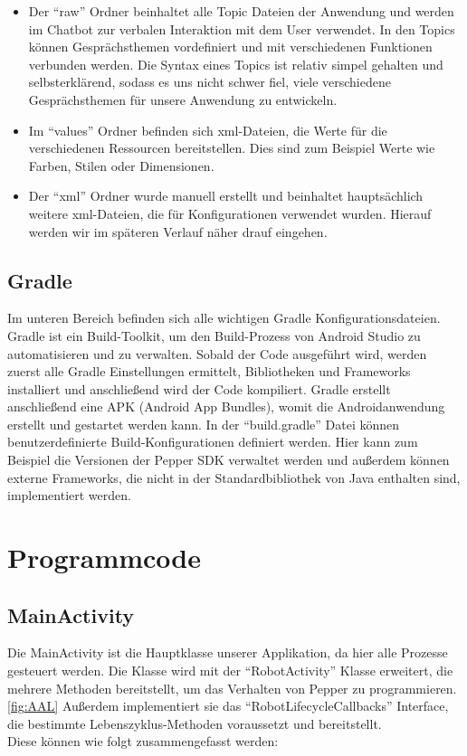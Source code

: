 \begin{itemize}
\item Der ``raw'' Ordner beinhaltet alle Topic Dateien der Anwendung und werden im Chatbot zur verbalen Interaktion mit dem User 
verwendet. In den Topics können Gesprächsthemen vordefiniert und mit verschiedenen Funktionen verbunden werden. Die Syntax eines Topics ist 
relativ simpel gehalten und selbsterklärend, sodass es uns nicht schwer fiel, viele verschiedene Gesprächsthemen für unsere Anwendung zu entwickeln. 

\item Im ``values'' Ordner befinden sich xml-Dateien, die Werte für die verschiedenen Ressourcen bereitstellen. Dies sind zum Beispiel
 Werte wie Farben, Stilen oder Dimensionen.

\item Der ``xml'' Ordner wurde manuell erstellt und beinhaltet hauptsächlich weitere xml-Dateien, die für Konfigurationen verwendet 
wurden. Hierauf werden wir im späteren Verlauf näher drauf eingehen. 
\end{itemize}

\subsection{Gradle}

Im unteren Bereich befinden sich alle wichtigen Gradle Konfigurationsdateien. Gradle ist ein Build-Toolkit, um den Build-Prozess von Android Studio 
zu automatisieren und zu verwalten. Sobald der Code ausgeführt wird, werden zuerst alle Gradle Einstellungen ermittelt, Bibliotheken und Frameworks 
installiert und anschließend wird der Code kompiliert. Gradle erstellt anschließend eine APK (Android App Bundles), womit die Androidanwendung 
erstellt und gestartet werden kann. 
\cite{Gradle}
In der ``build.gradle'' Datei können benutzerdefinierte Build-Konfigurationen definiert werden. Hier kann zum Beispiel die Versionen der Pepper 
SDK verwaltet werden und außerdem können externe Frameworks, die nicht in der Standardbibliothek von Java enthalten sind, implementiert werden.

\section{Programmcode}

\subsection{MainActivity}

Die MainActivity ist die Hauptklasse unserer Applikation, da hier alle Prozesse gesteuert werden. Die Klasse wird mit der 
``RobotActivity'' Klasse erweitert, die mehrere Methoden bereitstellt, um das Verhalten von Pepper zu programmieren. 
\ref{fig:AAL} Außerdem implementiert sie das ``RobotLifecycleCallbacks'' Interface, die bestimmte Lebenszyklus-Methoden voraussetzt 
und bereitstellt.\\ 
Diese können wie folgt zusammengefasst werden:

